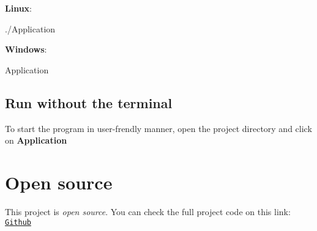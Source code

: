 {\bfseries Linux}\+:
\begin{DoxyCode}
./Application 
\end{DoxyCode}
 {\bfseries Windows}\+:
\begin{DoxyCode}
Application 
\end{DoxyCode}
\hypertarget{index_run_user_frendly}{}\subsection{Run without the terminal}\label{index_run_user_frendly}
To start the program in user-\/frendly manner, open the project directory and click on {\bfseries Application}\hypertarget{index_open_source}{}\section{Open source}\label{index_open_source}
This project is {\itshape open source}. You can check the full project code on this link\+: \href{https://github.com/DenisLapi/graph_coloring}{\tt Github} 